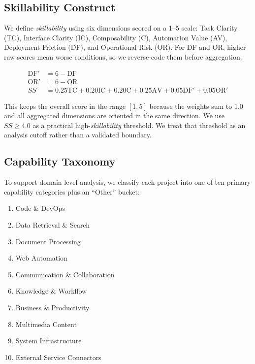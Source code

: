 \documentclass[sigconf,review,anonymous,nonacm]{acmart}
\newcommand{\skillability}{\textit{skillability}\xspace}
\newcommand{\sscore}{\textit{SS}\xspace}
\begin{document}
\subsection{Skillability Construct}

We define \skillability using six dimensions scored on a 1--5 scale: Task Clarity (TC), Interface Clarity (IC), Composability (C), Automation Value (AV), Deployment Friction (DF), and Operational Risk (OR). For DF and OR, higher raw scores mean worse conditions, so we reverse-code them before aggregation:

\begin{equation}
\begin{aligned}
\mathrm{DF}' &= 6 - \mathrm{DF}\\
\mathrm{OR}' &= 6 - \mathrm{OR}\\
\sscore &= 0.25\mathrm{TC} + 0.20\mathrm{IC} + 0.20\mathrm{C} + 0.25\mathrm{AV} + 0.05\mathrm{DF}' + 0.05\mathrm{OR}'
\end{aligned}
\end{equation}

This keeps the overall score in the range $[1,5]$ because the weights sum to 1.0 and all aggregated dimensions are oriented in the same direction. We use \(\sscore \ge 4.0\) as a practical high-\skillability threshold. We treat that threshold as an analysis cutoff rather than a validated boundary.

\subsection{Capability Taxonomy}

To support domain-level analysis, we classify each project into one of ten primary capability categories plus an ``Other'' bucket:
\begin{enumerate}[leftmargin=*,itemsep=1pt]
    \item Code \& DevOps
    \item Data Retrieval \& Search
    \item Document Processing
    \item Web Automation
    \item Communication \& Collaboration
    \item Knowledge \& Workflow
    \item Business \& Productivity
    \item Multimedia Content
    \item System Infrastructure
    \item External Service Connectors
\end{enumerate}
\end{document}

